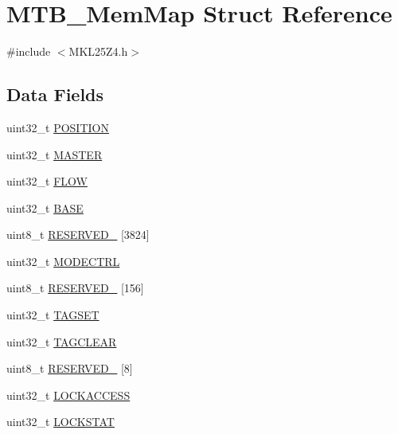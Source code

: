 \hypertarget{struct_m_t_b___mem_map}{}\section{M\+T\+B\+\_\+\+Mem\+Map Struct Reference}
\label{struct_m_t_b___mem_map}


{\ttfamily \#include $<$M\+K\+L25\+Z4.\+h$>$}

\subsection*{Data Fields}
\begin{DoxyCompactItemize}
\item 
uint32\+\_\+t \hyperlink{struct_m_t_b___mem_map_a2cd67baaacfdc2b6a991ed2099abd6cd}{P\+O\+S\+I\+T\+I\+ON}
\item 
uint32\+\_\+t \hyperlink{struct_m_t_b___mem_map_aa18cd97b47bac5b1af2e21151a28fce1}{M\+A\+S\+T\+ER}
\item 
uint32\+\_\+t \hyperlink{struct_m_t_b___mem_map_a9c9250c96bf782415786243a9e7515a3}{F\+L\+OW}
\item 
uint32\+\_\+t \hyperlink{struct_m_t_b___mem_map_aaa2f8b529d9bf3e3bb5bab8c8b073ead}{B\+A\+SE}
\item 
uint8\+\_\+t \hyperlink{struct_m_t_b___mem_map_a6ec763bccac6d03f5d21615e8190a0cf}{R\+E\+S\+E\+R\+V\+E\+D\+\_} \mbox{[}3824\mbox{]}
\item 
uint32\+\_\+t \hyperlink{struct_m_t_b___mem_map_a0ac5ad9012eeb1338d251d4fbf72dffb}{M\+O\+D\+E\+C\+T\+RL}
\item 
uint8\+\_\+t \hyperlink{struct_m_t_b___mem_map_a280910d9fdfd8acf24edab1d3950c732}{R\+E\+S\+E\+R\+V\+E\+D\+\_} \mbox{[}156\mbox{]}
\item 
uint32\+\_\+t \hyperlink{struct_m_t_b___mem_map_a64be91040ad6f82ba46ef20d9f4f9dcf}{T\+A\+G\+S\+ET}
\item 
uint32\+\_\+t \hyperlink{struct_m_t_b___mem_map_a770a2c3d064a4ccfac867429f7b677da}{T\+A\+G\+C\+L\+E\+AR}
\item 
uint8\+\_\+t \hyperlink{struct_m_t_b___mem_map_a186e433a83d42ecd6b4e218ea63d9674}{R\+E\+S\+E\+R\+V\+E\+D\+\_} \mbox{[}8\mbox{]}
\item 
uint32\+\_\+t \hyperlink{struct_m_t_b___mem_map_a85ddf0cc839ca195bad64336b6a86123}{L\+O\+C\+K\+A\+C\+C\+E\+SS}
\item 
uint32\+\_\+t \hyperlink{struct_m_t_b___mem_map_abae92c7b40f7130c62cdb81241fdd0e1}{L\+O\+C\+K\+S\+T\+AT}
\item 

\end{DoxyCompactItemize}
